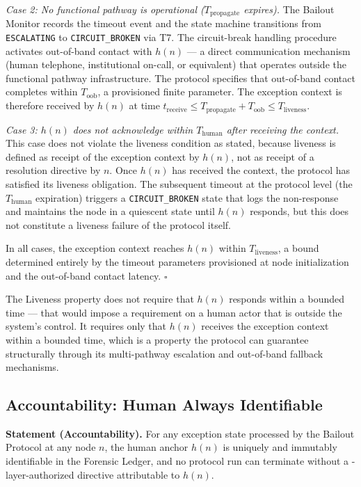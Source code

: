 \medskip
\noindent
\textit{Case 2: No functional pathway is operational ($T_{\text{propagate}}$ expires).} The Bailout Monitor records the timeout event and the state machine transitions from \texttt{ESCALATING} to \texttt{CIRCUIT\_BROKEN} via T7. The circuit-break handling procedure activates out-of-band contact with $h(n)$ — a direct communication mechanism (human telephone, institutional on-call, or equivalent) that operates outside the functional pathway infrastructure. The protocol specifies that out-of-band contact completes within $T_{\text{oob}}$, a provisioned finite parameter. The exception context is therefore received by $h(n)$ at time $t_{\text{receive}} \leq T_{\text{propagate}} + T_{\text{oob}} \leq T_{\text{liveness}}$.

\medskip
\noindent
\textit{Case 3: $h(n)$ does not acknowledge within $T_{\text{human}}$ after receiving the context.} This case does not violate the liveness condition as stated, because liveness is defined as receipt of the exception context by $h(n)$, not as receipt of a resolution directive by $n$. Once $h(n)$ has received the context, the protocol has satisfied its liveness obligation. The subsequent timeout at the protocol level (the $T_{\text{human}}$ expiration) triggers a \texttt{CIRCUIT\_BROKEN} state that logs the non-response and maintains the node in a quiescent state until $h(n)$ responds, but this does not constitute a liveness failure of the protocol itself.

\medskip
In all cases, the exception context reaches $h(n)$ within $T_{\text{liveness}}$, a bound determined entirely by the timeout parameters provisioned at node initialization and the out-of-band contact latency. $\square$

\medskip
The Liveness property does not require that $h(n)$ responds within a bounded time — that would impose a requirement on a human actor that is outside the system's control. It requires only that $h(n)$ receives the exception context within a bounded time, which is a property the protocol can guarantee structurally through its multi-pathway escalation and out-of-band fallback mechanisms.

\bigskip
\subsection{Accountability: Human Always Identifiable}
\label{sec:accountability}

\textbf{Statement (Accountability).} For any exception state processed by the Bailout Protocol at any node $n$, the human anchor $h(n)$ is uniquely and immutably identifiable in the Forensic Ledger, and no protocol run can terminate without a \purpose-layer-authorized directive attributable to $h(n)$.


